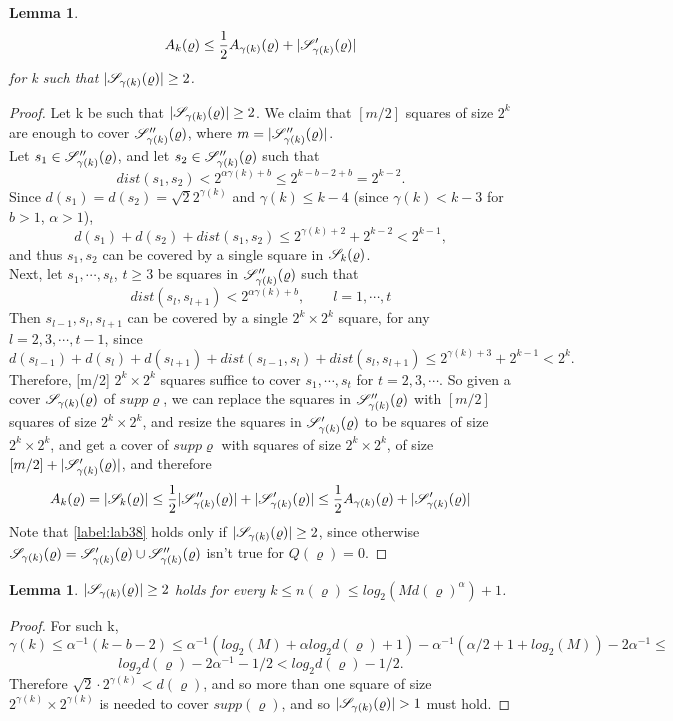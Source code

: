 \documentclass[11pt,reqno]{article}
\DeclarePairedDelimiter\abs{\lvert}{\rvert}%
\newtheorem{lemma}[thm]{Lemma}
\theoremstyle{definition}
\numberwithin{equation}{section}
\begin{document}
\begin{lemma} \label{lemma:GammaReason}
\begin{equation} \label{label:GammaRec}
A_k(\varrho) \leq \frac{1}{2} A_{\gamma(k)}(\varrho) + \abs{\SqrsSetTagGamma}
\end{equation}
for k such that $\abs{\SqrsSetGamma} \geq 2$.
\end{lemma}

\begin{proof}
Let k be such that $\abs{\SqrsSetGamma} \geq 2$. We claim that $[m/2]$ squares of size $2^k$ are enough to cover $\mathscr{S}^{\prime\prime}_{\gamma(k)}(\varrho)$, where $m=\abs{\SqrsSetDtagGamma}$.\\
Let $s_1 \in \mathscr{S}^{\prime\prime}_{\gamma(k)}(\varrho)$, and let $s_2 \in \mathscr{S}^{\prime\prime}_{\gamma(k)}(\varrho)$ such that $$dist(s_1, s_2) < 2^{\alpha \gamma(k) + b} \leq 2^{k-b-2 + b} = 2^{k-2}.$$
Since $d(s_1)=d(s_2)=\sqrt{2} 2^{\gamma(k)}$ and $\gamma(k) \leq k-4$ (since $\gamma(k) < k-3$ for $b>1$, $\alpha > 1$), 
$$d(s_1) + d(s_2) + dist(s_1, s_2) \leq 2^{\gamma(k) + 2} + 2^{k-2} < 2^{k-1},$$
and thus $s_1, s_2$ can be covered by a single square in $\mathscr{S}_k(\varrho)$.\\
Next, let $s_1, \cdots, s_t$, $t \geq 3$ be squares in $\mathscr{S}^{\prime\prime}_{\gamma(k)}(\varrho)$ such that
$$dist(s_l, s_{l+1}) < 2^{\alpha \gamma(k) + b}, \qquad l=1,\cdots,t$$
Then $s_{l-1}, s_l, s_{l+1}$ can be covered by a single $2^k\times2^k$ square, for any $l=2,3,\cdots,t-1$, since
$$d(s_{l-1}) + d(s_l) + d(s_{l+1}) + dist(s_{l-1}, s_l) + dist(s_l, s_{l+1}) \leq 2^{\gamma(k) + 3} + 2^{k-1} < 2^k.$$
Therefore, [m/2] $2^k\times2^k$ squares suffice to cover $s_1, \cdots, s_t$ for $t=2,3,\cdots$. So given a cover $\mathscr{S}_{\gamma(k)}(\varrho)$ of $supp\varrho$, we can replace the squares in $\mathscr{S}^{\prime\prime}_{\gamma(k)}(\varrho)$ with $[m/2]$ squares of size $2^k\times2^k$, and resize the squares in $\mathscr{S}^\prime_{\gamma(k)}(\varrho)$ to be squares of size $2^k\times2^k$, and get a cover of $supp\varrho$ with squares of size $2^k\times2^k$, of size $[m/2] + \abs{\SqrsSetTagGamma}$, and therefore
\begin{equation} \label{label:lab38}
A_k(\varrho) = \abs{\SqrsSet} \leq
\frac{1}{2}\abs{\SqrsSetDtagGamma} + \abs{\SqrsSetTagGamma} \leq
\frac{1}{2} A_{\gamma(k)}(\varrho) + \abs{\SqrsSetTagGamma}
\end{equation}
Note that \eqref{label:lab38} holds only if $\abs{\SqrsSetGamma} \geq 2$, since otherwise $\mathscr{S}_{\gamma(k)}(\varrho) = \mathscr{S}^\prime_{\gamma(k)}(\varrho) \cup \mathscr{S}^{\prime\prime}_{\gamma(k)}(\varrho)$ isn't true for $Q(\varrho)=0$.
\end{proof}

\begin{lemma} \label{lemma:GammaCond}
$\abs{\SqrsSetGamma} \geq 2$ holds for every $k \leq n(\varrho) \leq log_2(Md(\varrho)^\alpha) + 1$.
\end{lemma}
\begin{proof}
For such k, 
$$\gamma(k) \leq \alpha^{-1}(k-b-2) \leq
\alpha^{-1}(log_2(M) + \alpha log_2d(\varrho) + 1) - \alpha^{-1}(\alpha/2 + 1 + log_2(M)) - 2\alpha^{-1} \leq $$
$$log_2d(\varrho) - 2\alpha^{-1} - 1/2 < 
log_2d(\varrho)-1/2.$$
Therefore $\sqrt{2}\cdot2^{\gamma(k)} < d(\varrho)$, and so more than one square of size $2^{\gamma(k)}\times2^{\gamma(k)}$ is needed to cover $supp(\varrho)$, and so $\abs{\SqrsSetGamma} > 1$ must hold.
\end{proof}
\end{document}
